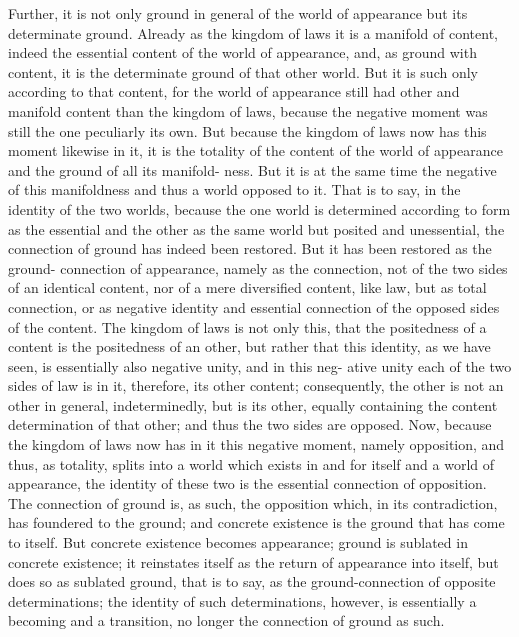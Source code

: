 Further, it is not only ground in general
of the world of appearance but its determinate ground.
Already as the kingdom of laws it is a manifold of content,
indeed the essential content of the world of appearance,
and, as ground with content, it is the determinate ground of that other world.
But it is such only according to that content, for the world of appearance
still had other and manifold content than the kingdom of laws, because
the negative moment was still the one peculiarly its own.
 But because
the kingdom of laws now has this moment likewise in it, it is the totality of
the content of the world of appearance and the ground of all its manifold-
ness.
But it is at the same time the negative of this manifoldness and thus
a world opposed to it.
That is to say, in the identity of the two worlds,
because the one world is determined according to form as the essential and
the other as the same world but posited and unessential, the connection of
ground has indeed been restored.
 But it has been restored as the ground-
connection of appearance, namely as the connection, not of the two sides
of an identical content, nor of a mere diversified content, like law,
but as total connection, or as negative identity and essential connection of the
opposed sides of the content.
The kingdom of laws is not only this, that the
positedness of a content is the positedness of an other,
 but rather that this
identity, as we have seen, is essentially also negative unity,
and in this neg-
ative unity each of the two sides of law is in it,
therefore, its other content;
consequently, the other is not an other in general, indeterminedly, but is its
other, equally containing the content determination of that other; and thus
the two sides are opposed.
Now, because the kingdom of laws now has in it
this negative moment, namely opposition, and thus, as totality, splits into a
world which exists in and for itself and a world of appearance,
the identity
of these two is the essential connection of opposition.
The connection of ground is, as such, the opposition which, in its contradiction, has foundered
to the ground; and concrete existence is the ground that has come to itself.
But concrete existence becomes appearance;
ground is sublated in concrete
existence;
it reinstates itself as the return of appearance into itself,
 but
does so as sublated ground, that is to say, as the ground-connection of
opposite determinations;
the identity of such determinations, however, is
essentially a becoming and a transition,
no longer the connection of ground as such.

